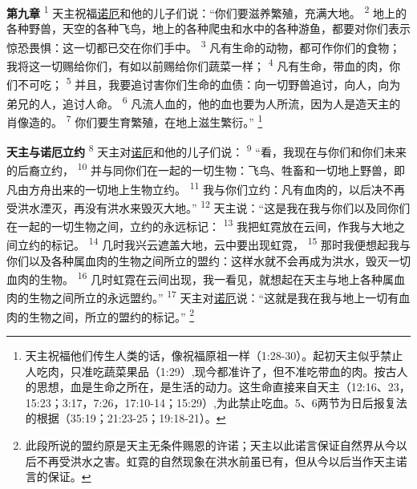 \textbf{第九章\quad}
\textsuperscript{1}
天主祝福\uline{诺厄}和他的儿子们说：“你们要滋养繁殖，充满大地。
\textsuperscript{2}
地上的各种野兽，天空的各种飞鸟，地上的各种爬虫和水中的各种游鱼，都要对你们表示惊恐畏惧：这一切都已交在你们手中。
\textsuperscript{3}
凡有生命的动物，都可作你们的食物；我将这一切赐给你们，有如以前赐给你们蔬菜一样；
\textsuperscript{4}
凡有生命，带血的肉，你们不可吃；
\textsuperscript{5}
并且，我要追讨害你们生命的血债：向一切野兽追讨，向人，向为弟兄的人，追讨人命。
\textsuperscript{6}
凡流人血的，他的血也要为人所流，因为人是造天主的肖像造的。
\textsuperscript{7}
你们要生育繁殖，在地上滋生繁衍。”
\footnote{天主祝福他们传生人类的话，像祝福原祖一样（1:28-30）。起初天主似乎禁止人吃肉，只准吃蔬菜果品（1:29）,现今都准许了，但不准吃带血的肉。按古人的思想，血是生命之所在，是生活的动力。这生命直接来自天主（12:16、23，15:23；3:17，7:26，17:10-14；15:29）,为此禁止吃血。5、6两节为日后报复法的根据（35:19；21:23-25；19:18-21）。}

\textbf{天主与诺厄立约\quad}
\textsuperscript{8}
天主对\uline{诺厄}和他的儿子们说：
\textsuperscript{9}
“看，我现在与你们和你们未来的后裔立约，
\textsuperscript{10}
并与同你们在一起的一切生物：飞鸟、牲畜和一切地上野兽，即凡由方舟出来的一切地上生物立约。
\textsuperscript{11}
我与你们立约：凡有血肉的，以后决不再受洪水湮灭，再没有洪水来毁灭大地。”
\textsuperscript{12}
天主说：“这是我在我与你们以及同你们在一起的一切生物之间，立约的永远标记：
\textsuperscript{13}
我把虹霓放在云间，作我与大地之间立约的标记。
\textsuperscript{14}
几时我兴云遮盖大地，云中要出现虹霓，
\textsuperscript{15}
那时我便想起我与你们以及各种属血肉的生物之间所立的盟约：这样水就不会再成为洪水，毁灭一切血肉的生物。
\textsuperscript{16}
几时虹霓在云间出现，我一看见，就想起在天主与地上各种属血肉的生物之间所立的永远盟约。”
\textsuperscript{17}
天主对\uline{诺厄}说：“这就是我在我与地上一切有血肉的生物之间，所立的盟约的标记。”
\footnote{此段所说的盟约原是天主无条件赐恩的许诺；天主以此诺言保证自然界从今以后不再受洪水之害。虹霓的自然现象在洪水前虽已有，但从今以后当作天主诺言的保证。}

